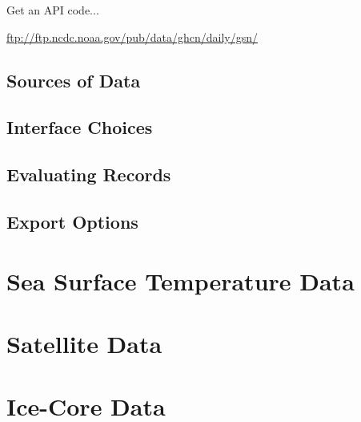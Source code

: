 \documentclass{article}\usepackage[]{graphicx}\usepackage[]{color}
\begin{document}
Get an API code...


\url{ftp://ftp.ncdc.noaa.gov/pub/data/ghcn/daily/gsn/}

\subsection{Sources of Data}


\subsection{Interface Choices}

\subsection{Evaluating Records}

\subsection{Export Options}

\section{Sea Surface Temperature Data}

\section{Satellite Data}

\section{Ice-Core Data}
\end{document}
